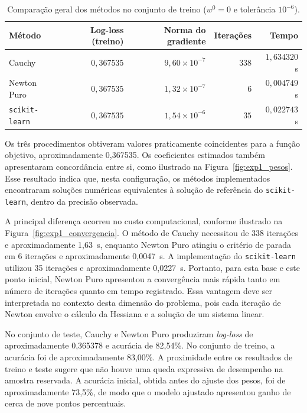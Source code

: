 \documentclass{article}
\theoremstyle{remark}
\begin{document}
\begin{table}[htbp]
\centering
\caption{Comparação geral dos métodos no conjunto de treino ($w^0 = 0$ e tolerância $10^{-6}$).}
\label{tab:exp1_comparacao}
\renewcommand{\arraystretch}{1.15}
{\small
\begin{tabularx}{\textwidth}{@{} X r r r r @{}}
\toprule
\textbf{Método} & \textbf{Log-loss (treino)} & \textbf{Norma do gradiente} & \textbf{Iterações} & \textbf{Tempo} \\
\midrule
Cauchy & $0{,}367535$ & $9{,}60 \times 10^{-7}$ & $338$ & $1{,}634320$~s \\
Newton Puro & $0{,}367535$ & $1{,}32 \times 10^{-7}$ & $6$ & $0{,}004749$~s \\
\texttt{scikit-learn} & $0{,}367535$ & $1{,}54 \times 10^{-6}$ & $35$ & $0{,}022743$~s \\
\bottomrule
\end{tabularx}
}
\end{table}

Os três procedimentos obtiveram valores praticamente coincidentes para a função objetivo, aproximadamente 0,367535. Os coeficientes estimados também apresentaram concordância entre si, como ilustrado na Figura~\ref{fig:exp1_pesos}. Esse resultado indica que, nesta configuração, os métodos implementados encontraram soluções numéricas equivalentes à solução de referência do \texttt{scikit-learn}, dentro da precisão observada.

A principal diferença ocorreu no custo computacional, conforme ilustrado na Figura~\ref{fig:exp1_convergencia}. O método de Cauchy necessitou de 338 iterações e aproximadamente 1,63~s, enquanto Newton Puro atingiu o critério de parada em 6 iterações e aproximadamente 0,0047~s. A implementação do \texttt{scikit-learn} utilizou 35 iterações e aproximadamente 0,0227~s. Portanto, para esta base e este ponto inicial, Newton Puro apresentou a convergência mais rápida tanto em número de iterações quanto em tempo registrado. Essa vantagem deve ser interpretada no contexto desta dimensão do problema, pois cada iteração de Newton envolve o cálculo da Hessiana e a solução de um sistema linear.

No conjunto de teste, Cauchy e Newton Puro produziram \textit{log-loss} de aproximadamente 0,365378 e acurácia de 82,54\%. No conjunto de treino, a acurácia foi de aproximadamente 83,00\%. A proximidade entre os resultados de treino e teste sugere que não houve uma queda expressiva de desempenho na amostra reservada. A acurácia inicial, obtida antes do ajuste dos pesos, foi de aproximadamente 73,5\%, de modo que o modelo ajustado apresentou ganho de cerca de nove pontos percentuais.
\end{document}
